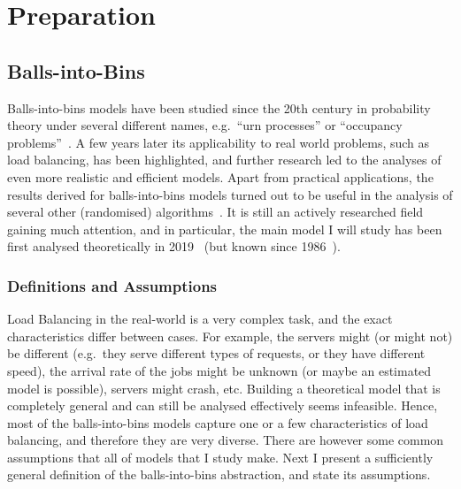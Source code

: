 \chapter{Preparation}\label{preparation}

\ifpdf
    \graphicspath{{Chapter2/Figs/Raster/}{Chapter2/Figs/PDF/}{Chapter2/Figs/}}
\else
    \graphicspath{{Chapter2/Figs/Vector/}{Chapter2/Figs/}}
\fi



\section{Balls-into-Bins}


Balls-into-bins models have been studied since the 20th century in probability theory under several different names, e.g.\ ``urn processes'' or ``occupancy problems''~\cite{kolchin1978coined}. A few years later its applicability to real world problems, such as load balancing, has been highlighted, and further research led to the analyses of even more realistic and efficient models. Apart from practical applications, the results derived for balls-into-bins models turned out to be useful in the analysis of several other (randomised) algorithms~\cite{edmonds2006cakecutting}. It is still an actively researched field gaining much attention, and in particular, the main model I will study has been first analysed theoretically in 2019~\cite{dwivedi2019firstthinning} (but known since 1986~\cite{derek1986twothinningfirstattempt}).


\subsection{Definitions and Assumptions} \label{definitions}



Load Balancing in the real-world is a very complex task, and the exact characteristics differ between cases. For example, the servers might (or might not) be different (e.g.\ they serve different types of requests, or they have different speed), the arrival rate of the jobs might be unknown (or maybe an estimated model is possible), servers might crash, etc. Building a theoretical model that is completely general and can still be analysed effectively seems infeasible. Hence, most of the balls-into-bins models capture one or a few characteristics of load balancing, and therefore they are very diverse. There are however some common assumptions that all of models that I study make. Next I present a sufficiently general definition of the balls-into-bins abstraction, and state its assumptions. 

